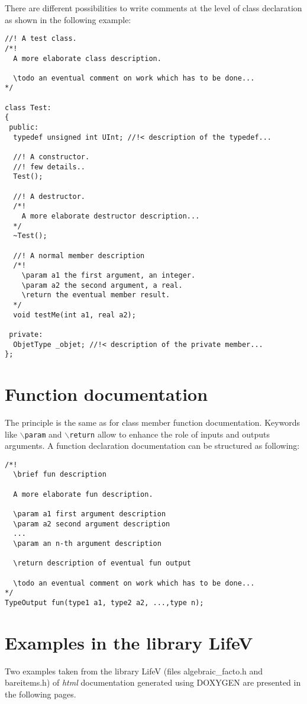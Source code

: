 \documentclass[a4paper,10pt]{article}
\begin{document}
There are different possibilities to write comments at the
level of class declaration as shown in the following example:

\begin{verbatim}
//! A test class.
/*!
  A more elaborate class description.

  \todo an eventual comment on work which has to be done...
*/

class Test:
{
 public:
  typedef unsigned int UInt; //!< description of the typedef...

  //! A constructor.
  //! few details..
  Test();

  //! A destructor.
  /*!
    A more elaborate destructor description...
  */
  ~Test();

  //! A normal member description
  /*!
    \param a1 the first argument, an integer.
    \param a2 the second argument, a real.
    \return the eventual member result.
  */
  void testMe(int a1, real a2);

 private:
  ObjetType _objet; //!< description of the private member...
};
\end{verbatim}

\section{Function documentation}

The principle is the same as for class member function documentation.
Keywords like \texttt{$\backslash$param} and \texttt{$\backslash$return} allow
to enhance the role of inputs and outputs arguments.
A function declaration documentation can be structured as following:

\begin{verbatim}
/*!
  \brief fun description

  A more elaborate fun description.

  \param a1 first argument description
  \param a2 second argument description
  ...
  \param an n-th argument description

  \return description of eventual fun output

  \todo an eventual comment on work which has to be done...
*/
TypeOutput fun(type1 a1, type2 a2, ...,type n);
\end{verbatim}

\section{Examples in the library LifeV}

Two examples taken
from the library LifeV (files algebraic\_facto.h and bareitems.h) of
{\it html} documentation generated using DOXYGEN are presented in the
following pages.
\end{document}
